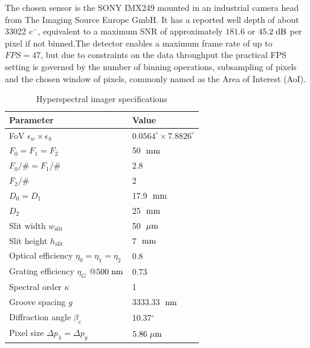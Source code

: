 The chosen sensor is the SONY IMX249 mounted in an industrial camera head from The Imaging Source Europe GmbH. It has a reported well depth of about 33022 $e^{-}$, equivalent to a maximum SNR of approximately $181.6$ or $45.2 \hspace{3pt} \rm{dB}$ per pixel if not binned.The detector enables a maximum frame rate of up to $FPS=47$, but due to constraints on the data throughput the practical FPS setting is governed by the number of binning operations, subsampling of pixels and the chosen window of pixels, commonly named as the Area of Interest (AoI).
\begin{table}[htbp]
	\caption{Hyperspectral imager specifications}
	\label{tab:optics}
	\centering
			\begin{tabular}{l l}
				\hline
				Parameter & Value \\
				\hline 
				FoV $\epsilon_w \times \epsilon_h$ &	$0.0564^{\circ} \times 7.8826^{\circ}$  \\
				$F_0=F_1=F_2$ & 50 $\hspace{3pt} \rm{mm}$ \\
				$F_0/\#=F_1/\#$ & 2.8  \\
				$F_2/\#$ & 2 \\
				$D_0=D_1$  & 17.9 $\hspace{3pt} \rm{mm}$ \\
				$D_2$ &  25 $\hspace{3pt} \rm{mm}$ \\
				Slit width $w_{\text{slit}}$ & 50 $\hspace{3pt} \mu\rm{m}$ \\
				Slit height $h_{\text{slit}}$ & 7 $\hspace{3pt} \rm{mm}$ \\
				Optical efficiency $\eta_{0}=\eta_{1}=\eta_{2}$ & $0.8$ \\
				Grating efficiency $\eta_{G}$ @$500\hspace{3pt} \rm{nm}$ & 0.73 \\
				Spectral order $\kappa$ & 1 \\
				Groove spacing $g$ & 3333.33 $\hspace{3pt} \rm{nm}$ \\
				Diffraction angle $\beta_c$ & 10.37$^{\circ}$ \\
				Pixel size $\Delta p_\lambda=\Delta p_y$ & $5.86 \hspace{3pt} \mu\rm{m}$ \\

\end{tabular}
\end{table}
